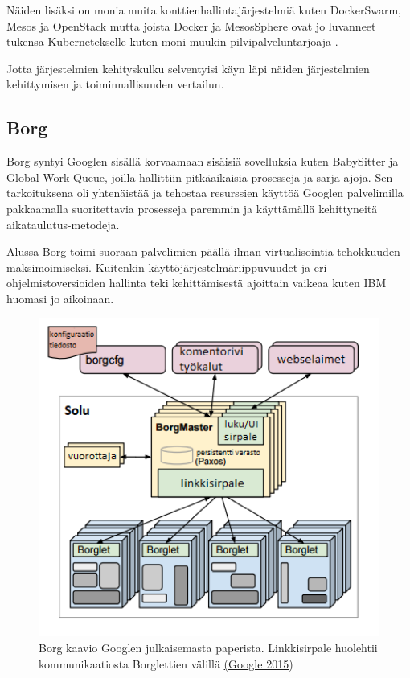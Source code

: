 \documentclass[finnish,gradu]{tktltiki3}
\begin{document}
Näiden lisäksi on monia muita konttienhallintajärjestelmiä kuten DockerSwarm, Mesos ja OpenStack mutta joista Docker ja MesosSphere ovat jo luvanneet tukensa Kubernetekselle kuten moni muukin pilvipalveluntarjoaja \cite{practical-container}.

Jotta järjestelmien kehityskulku selventyisi käyn läpi näiden järjestelmien kehittymisen ja toiminnallisuuden vertailun.

\subsection{Borg}

Borg syntyi Googlen sisällä korvaamaan sisäisiä sovelluksia kuten BabySitter ja Global Work Queue, joilla hallittiin pitkäaikaisia prosesseja ja sarja-ajoja. Sen tarkoituksena oli yhtenäistää ja tehostaa resurssien käyttöä Googlen palvelimilla pakkaamalla suoritettavia prosesseja paremmin ja käyttämällä kehittyneitä aikataulutus-metodeja.

Alussa Borg toimi suoraan palvelimien päällä ilman virtualisointia tehokkuuden maksimoimiseksi. Kuitenkin käyttöjärjestelmäriippuvuudet ja eri ohjelmistoversioiden hallinta teki kehittämisestä ajoittain vaikeaa kuten IBM huomasi jo aikoinaan.

\begin{figure}[h]
    \centering
    \includegraphics[width=1\textwidth]{images/borg.png}
    \caption{Borg kaavio Googlen julkaisemasta paperista. Linkkisirpale huolehtii kommunikaatiosta Borglettien välillä \href{https://ai.google/research/pubs/pub43438}{(Google 2015)}}
    \label{fig:borg}
\end{figure}
\end{document}
